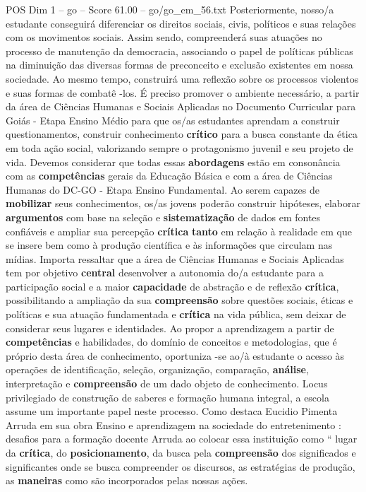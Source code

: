 \begin{textsample}{POS Dim 1 – go – Score 61.00 – go/go\_em\_56.txt}
Posteriormente, nosso/a estudante conseguirá diferenciar os direitos sociais, civis, políticos e suas relações com os movimentos sociais.
Assim sendo, compreenderá suas atuações no processo de manutenção da democracia, associando o papel de políticas públicas na diminuição das diversas formas de preconceito e exclusão existentes em nossa sociedade.
Ao mesmo tempo, construirá uma reflexão sobre os processos violentos e suas formas de combatê -los.
É preciso promover o ambiente necessário, a partir da área de Ciências Humanas e Sociais Aplicadas no Documento Curricular para Goiás - Etapa Ensino Médio para que os/as estudantes aprendam a construir questionamentos, construir conhecimento \textbf{crítico} para a busca constante da ética em toda ação social, valorizando sempre o protagonismo juvenil e seu projeto de vida.
Devemos considerar que todas essas \textbf{abordagens} estão em consonância com as \textbf{competências} gerais da Educação Básica e com a área de Ciências Humanas do DC-GO - Etapa Ensino Fundamental.
Ao serem capazes de \textbf{mobilizar} seus conhecimentos, os/as jovens poderão construir hipóteses, elaborar \textbf{argumentos} com base na seleção e \textbf{sistematização} de dados em fontes confiáveis e ampliar sua percepção \textbf{crítica} \textbf{tanto} em relação à realidade em que se insere bem como à produção científica e às informações que circulam nas mídias.
Importa ressaltar que a área de Ciências Humanas e Sociais Aplicadas tem por objetivo \textbf{central} desenvolver a autonomia do/a estudante para a participação social e a maior \textbf{capacidade} de abstração e de reflexão \textbf{crítica}, possibilitando a ampliação da sua \textbf{compreensão} sobre questões sociais, éticas e políticas e sua atuação fundamentada e \textbf{crítica} na vida pública, sem deixar de considerar seus lugares e identidades.
Ao propor a aprendizagem a partir de \textbf{competências} e habilidades, do domínio de conceitos e metodologias, que é próprio desta área de conhecimento, oportuniza -se ao/à estudante o acesso às operações de identificação, seleção, organização, comparação, \textbf{análise}, interpretação e \textbf{compreensão} de um dado objeto de conhecimento.
Locus privilegiado de construção de saberes e formação humana integral, a escola assume um importante papel neste processo.
Como destaca Eucidio Pimenta Arruda em sua obra Ensino e aprendizagem na sociedade do entretenimento : desafios para a formação docente Arruda ao colocar essa instituição como “ lugar da \textbf{crítica}, do \textbf{posicionamento}, da busca pela \textbf{compreensão} dos significados e significantes onde se busca compreender os discursos, as estratégias de produção, as \textbf{maneiras} como são incorporados pelas nossas ações.

\end{textsample}
